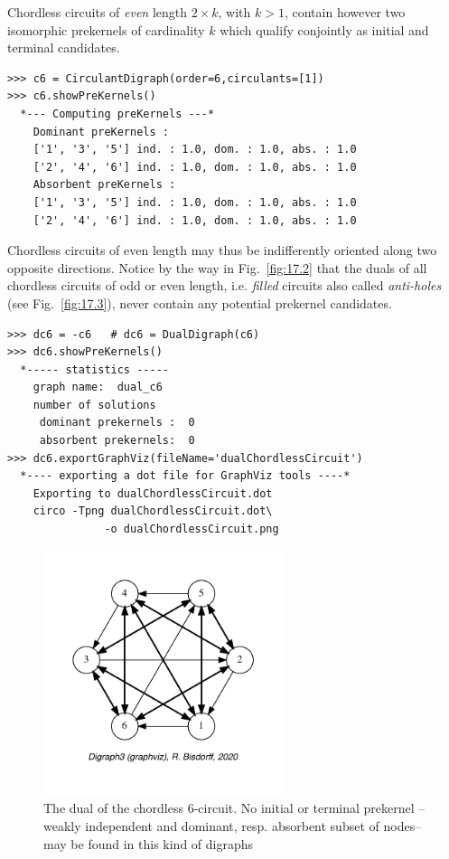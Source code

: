 Chordless circuits of \emph{even} length $2 \times k$, with $k > 1$, contain however two isomorphic prekernels of cardinality $k$ which qualify conjointly as initial and terminal candidates.
\begin{lstlisting}[caption={The prekernels of the 6-circuit digraph},label=list:17.6]
>>> c6 = CirculantDigraph(order=6,circulants=[1])
>>> c6.showPreKernels()
  *--- Computing preKernels ---*
    Dominant preKernels :
    ['1', '3', '5'] ind. : 1.0, dom. : 1.0, abs. : 1.0
    ['2', '4', '6'] ind. : 1.0, dom. : 1.0, abs. : 1.0
    Absorbent preKernels :
    ['1', '3', '5'] ind. : 1.0, dom. : 1.0, abs. : 1.0
    ['2', '4', '6'] ind. : 1.0, dom. : 1.0, abs. : 1.0
\end{lstlisting}

Chordless circuits of even length may thus be indifferently oriented along two opposite directions. Notice by the way in Fig.~\vref{fig:17.2} that the duals of all chordless circuits of odd or even length, i.e. \emph{filled} circuits also called \emph{anti-holes} (see Fig.~\vref{fig:17.3}), never contain any potential prekernel candidates.
\begin{lstlisting}[caption={The prekernels of the dual of the 6-circuit digraph},label=list:17.7]
>>> dc6 = -c6   # dc6 = DualDigraph(c6)
>>> dc6.showPreKernels()
  *----- statistics -----
    graph name:  dual_c6
    number of solutions
     dominant prekernels :  0
     absorbent prekernels:  0
>>> dc6.exportGraphViz(fileName='dualChordlessCircuit')
  *---- exporting a dot file for GraphViz tools ----*
    Exporting to dualChordlessCircuit.dot
    circo -Tpng dualChordlessCircuit.dot\
               -o dualChordlessCircuit.png
\end{lstlisting}
\begin{figure}[ht]
\sidecaption[t]
\includegraphics[width=7cm]{Figures/17-2-dualChordlessCircuit.pdf}
\caption{The dual of the chordless 6-circuit. No initial or terminal prekernel --weakly independent and dominant, resp. absorbent subset of nodes-- may be found in this kind of digraphs}
\label{fig:17.2}       %
\end{figure}

